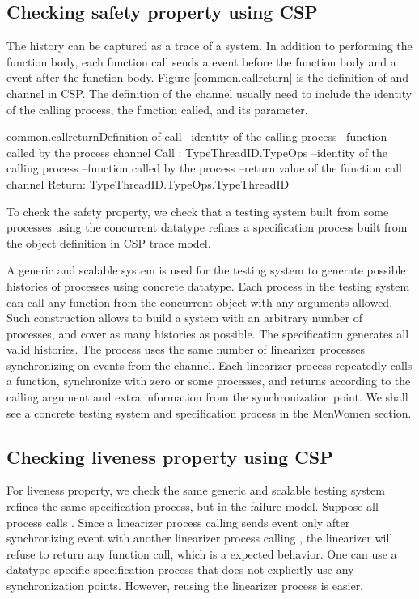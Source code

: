 \documentclass{article}
\begin{document}

\subsection{Checking safety property using CSP} 
The history can be captured as a trace of a system. In addition to performing the function body, each function call sends a  event before the function body and a  event after the function body. Figure \ref{common.callreturn} is the definition of  and  channel in CSP. The definition of the channel usually need to include the identity of the calling process, the function called, and its parameter. 

\begin{cspinline}{common.callreturn}{Definition of call}
--identity of the calling process
--function called by the process
channel Call : TypeThreadID.TypeOps
--identity of the calling process
--function called by the process
--return value of the function call
channel Return: TypeThreadID.TypeOps.TypeThreadID
\end{cspinline}

To check the safety property, we check that a testing system built from some processes using the concurrent datatype refines a specification process built from the object definition in CSP trace model.

A generic and scalable system is used for the testing system to generate possible histories of processes using concrete datatype. Each process in the testing system can call any function from the concurrent object with any arguments allowed. Such construction allows to build a system with an arbitrary number of processes, and cover as many histories as possible. 
The specification generates all valid histories. The process uses the same number of linearizer processes synchronizing on events from the  channel. Each linearizer process repeatedly calls a function, synchronize with zero or some processes, and returns according to the calling argument and extra information from the synchronization point. 
We shall see a concrete testing system and specification process in the MenWomen section. 

\subsection{Checking liveness property using CSP}
For liveness property, we check the same generic and scalable testing system refines the same specification process, but in the failure model. Suppose all process calls . Since a linearizer process calling  sends  event only after synchronizing  event with another linearizer process calling , the linearizer will refuse to return any function call, which is a expected behavior. One can use a datatype-specific specification process that does not explicitly use any synchronization points. However, reusing the linearizer process is easier. 
\end{document}
